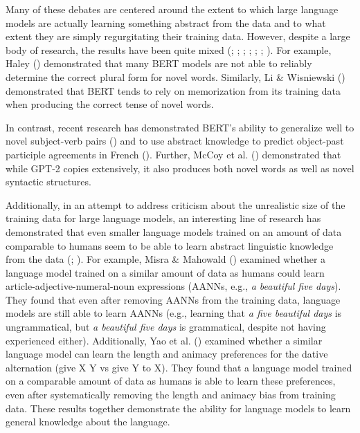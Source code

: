 \documentclass[
  12pt,
  letterpaper,
]{scrreport}
\begin{document}
Many of these debates are centered around the extent to which large
language models are actually learning something abstract from the data
and to what extent they are simply regurgitating their training data.
However, despite a large body of research, the results have been quite
mixed (;
;
;
;
;
;
). For
example, Haley () demonstrated
that many BERT models are not able to reliably determine the correct
plural form for novel words. Similarly, Li \& Wisniewski
() demonstrated that BERT
tends to rely on memorization from its training data when producing the
correct tense of novel words.

In contrast, recent research has demonstrated BERT's ability to
generalize well to novel subject-verb pairs
() and
to use abstract knowledge to predict object-past participle agreements
in French (). Further, McCoy et al.
() demonstrated that while
GPT-2 copies extensively, it also produces both novel words as well as
novel syntactic structures.

Additionally, in an attempt to address criticism about the unrealistic
size of the training data for large language models, an interesting line
of research has demonstrated that even smaller language models trained
on an amount of data comparable to humans seem to be able to learn
abstract linguistic knowledge from the data
(;
). For
example, Misra \& Mahowald
() examined whether a
language model trained on a similar amount of data as humans could learn
article-adjective-numeral-noun expressions (AANNs, e.g., \emph{a
beautiful five days}). They found that even after removing AANNs from
the training data, language models are still able to learn AANNs (e.g.,
learning that \emph{a five beautiful days} is ungrammatical, but \emph{a
beautiful five days} is grammatical, despite not having experienced
either). Additionally, Yao et al.
() examined whether a
similar language model can learn the length and animacy preferences for
the dative alternation (give X Y vs give Y to X). They found that a
language model trained on a comparable amount of data as humans is able
to learn these preferences, even after systematically removing the
length and animacy bias from training data. These results together
demonstrate the ability for language models to learn general knowledge
about the language.
\end{document}
